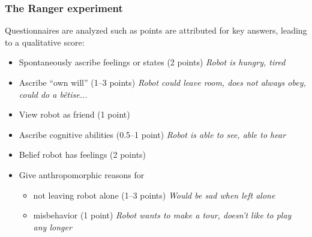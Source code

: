 \documentclass{frontiersSCNS} %
\begin{document}
\subsubsection{The Ranger experiment}

Questionnaires are analyzed such as points are 
attributed for key answers, leading to a 
qualitative score:

\begin{itemize}
    \item Spontaneously ascribe feelings or states (2 points) {\it Robot is
        hungry, tired}
    \item Ascribe ``own will'' (1--3 points) {\it Robot could leave room, does not
        always obey, could do a b\^{e}tise...}
    \item View robot as friend (1 point)
    \item Ascribe cognitive abilities (0.5--1 point) {\it Robot is able to see,
        able to hear}
    \item Belief robot has feelings (2 points)
    \item Give anthropomorphic reasons for
        \begin{itemize}
            \item not leaving robot alone (1--3 points) {\it Would be sad when
                left alone}
            \item misbehavior (1 point) {\it Robot wants to make a tour, doesn't
                like to play any longer}
        \end{itemize}
\end{itemize}
\end{document}
